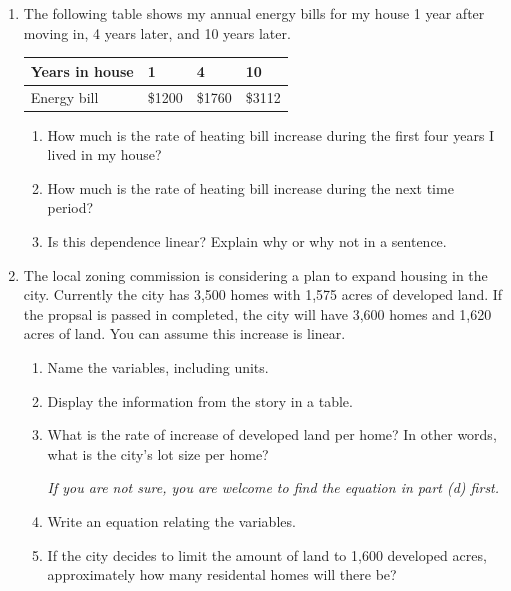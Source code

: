 \documentclass[12pt]{article}
\begin{document}
\begin{enumerate}

\item The following table shows my annual energy bills for my house 1 year after moving in, 4 years later, and 10 years later.

\begin{center}
\begin{tabular} {|l||l|l|l|} \hline
Years in house & 1 & 4 & 10  \\ \hline
Energy bill & \$1200 & \$1760 & \$3112 \\ \hline
\end{tabular}
\end{center}

\begin{enumerate}
\item How much is the rate of heating bill increase during the first four years I lived in my house?
\vfill
\item How much is the rate of heating bill increase during the next time period?
\vfill
\item Is this dependence linear? Explain why or why not in a sentence.
\vfill
\end{enumerate}

\newpage %

\item The local zoning commission is considering a plan to expand housing in the city.  Currently the city has 3,500 homes with 1,575 acres of developed land.  If the propsal is passed in completed, the city will have 3,600 homes and 1,620 acres of land.  You can assume this increase is linear.

\begin{enumerate}
\item Name the variables, including units.
\vfill
\item Display the information from the story in a table.
\vfill
\item What is the rate of increase of developed land per home?  In other words, what is the city's lot size per home?

\emph{If you are not sure, you are welcome to find the equation in part (d) first.}
\vfill
\item Write an equation relating the variables.
\vfill
\item If the city decides to limit the amount of land to 1,600 developed acres, approximately how many residental homes will there be?
\vfill
\end{enumerate}


\end{enumerate}
\end{document}

